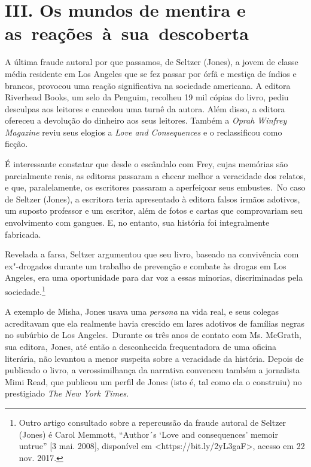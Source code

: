 \section*{III. Os mundos de mentira e as~reações~à~sua~descoberta}

A última fraude autoral por que passamos, de Seltzer (Jones), a jovem de
classe média residente em Los Angeles que se fez passar por órfã e
mestiça de índios e brancos, provocou uma reação significativa na
sociedade americana. A editora Riverhead Books, um selo da Penguim,
recolheu 19 mil cópias do livro, pediu desculpas aos leitores e cancelou
uma turnê da autora. Além disso, a editora ofereceu a devolução do
dinheiro aos seus leitores. Também a \emph{Oprah Winfrey Magazine} reviu
seus elogios a \emph{Love and Consequences} e o reclassificou como
ficção.

É interessante constatar que desde o escândalo com Frey, cujas memórias
são parcialmente reais, as editoras passaram a checar melhor a
veracidade dos relatos, e que, paralelamente, os escritores passaram a
aperfeiçoar seus embustes.~No caso de Seltzer (Jones), a escritora teria
apresentado à editora falsos irmãos adotivos, um suposto professor e um
escritor, além de fotos e cartas que comprovariam seu envolvimento com
gangues. E, no entanto, sua história foi integralmente fabricada.

Revelada a farsa, Seltzer argumentou que seu livro, baseado na
convivência com ex"-drogados durante um trabalho de prevenção e combate
às drogas em Los Angeles, era uma oportunidade para dar voz a essas
minorias, discriminadas pela sociedade.\footnote{Outro artigo consultado
  sobre a repercussão da fraude autoral de Seltzer (Jones) é Carol
  Memmott, ``Author´s `Love and consequences' memoir untrue'' {[}3 mai.
  2008{]}, disponível em \textless{}https://bit.ly/2yL3gaF\textgreater{}, acesso em 22 nov. 2017.}

A exemplo de Misha, Jones usava uma \emph{persona} na vida real, e seus
colegas acreditavam que ela realmente havia crescido em lares adotivos
de famílias negras no subúrbio de Los Angeles.~Durante os três anos de
contato com Ms. McGrath, sua editora, Jones, até então a desconhecida
frequentadora de uma oficina literária, não levantou a menor suspeita
sobre a veracidade da história. Depois de publicado o livro, a
verossimilhança da narrativa convenceu também a jornalista Mimi Read,
que publicou um perfil de Jones (isto é, tal como ela o construiu) no
prestigiado \emph{The New York Times}.

